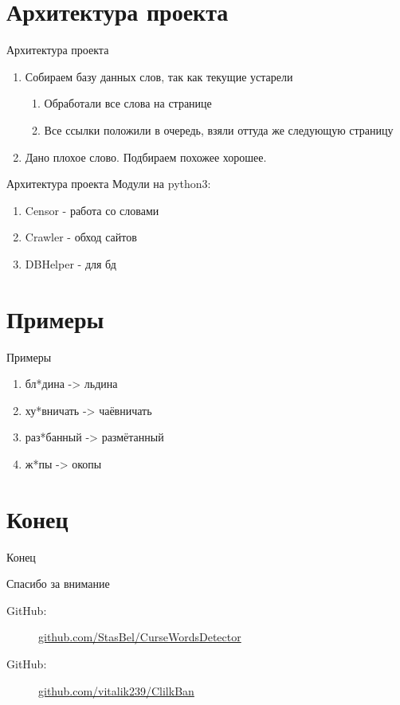 \documentclass{beamer}
\begin{document}
\section{Архитектура проекта}
\begin{frame}[t]{Архитектура проекта}
\begin{enumerate}
	\item
	Собираем базу данных слов, так как текущие устарели
	\begin{enumerate}
	\item
	Обработали все слова на странице
	\item
	Все ссылки положили в очередь, взяли оттуда же следующую страницу
	\end{enumerate}
\item
    Дано плохое слово. Подбираем похожее хорошее.
        
\end{enumerate}
\end{frame}
\begin{frame}[t]{Архитектура проекта}
    Модули на python3:
    \begin{enumerate}
        \item Censor - работа со словами
        \item Crawler - обход сайтов
        \item DBHelper - для бд
    \end{enumerate}
\end{frame}

\section{Примеры}
\begin{frame}[t]{Примеры}
\begin{center}
\begin{enumerate}
	\item бл*дина -> льдина 
	\item ху*вничать -> чаёвничать
	\item раз*банный -> размётанный
	\item ж*пы -> окопы
\end{enumerate}
\end{center}
\end{frame}

\section{Конец}
\begin{frame}[t]{Конец}
    \begin{center}
    Спасибо за внимание
    \end{center}
	\begin{description}
		\item[GitHub:]  \url{github.com/StasBel/CurseWordsDetector}
		\item[GitHub:]  \url{github.com/vitalik239/ClilkBan}
	\end{description}
\end{frame}
\end{document}
